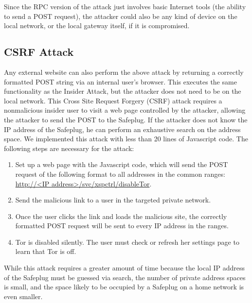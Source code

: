 \documentclass[letterpaper,twocolumn,10pt]{article}
\begin{document}
Since the RPC version of the attack just involves basic Internet tools (the ability to send a POST request), the attacker could also be any kind of device on the local network, or the local gateway itself, if it is compromised.

\subsection{CSRF Attack}
Any external website can also perform the above attack by returning a correctly formatted POST string via an internal user's browser.  This executes the same functionality as the Insider Attack, but the attacker does not need to be on the local network.  This Cross Site Request Forgery (CSRF) attack requires a nonmalicious insider user to visit a web page controlled by the attacker, allowing the attacker to send the POST to the Safeplug.  If the attacker does not know the IP address of the Safeplug, he can perform an exhaustive search on the address space.  We implemented this attack with less than 20 lines of Javascript code.  The following steps are necessary for the attack:

\begin{enumerate} \setlength{\itemsep}{.2mm}
\item Set up a web page with the Javascript code, which will send the POST request of the following format to all addresses in the common ranges: \url{http://<IP address>/svc/xspctrl/disableTor}.
\item Send the malicious link to a user in the targeted private network.
\item Once the user clicks the link and loads the malicious site, the correctly formatted POST request will be sent to every IP address in the ranges.  
\item Tor is disabled silently.  The user must check or refresh her settings page to learn that Tor is off.  
\end{enumerate}  

While this attack requires a greater amount of time because the local IP address of the Safeplug must be guessed via search, the number of private address spaces is small, and the space likely to be occupied by a Safeplug on a home network is even smaller.  
\end{document}
